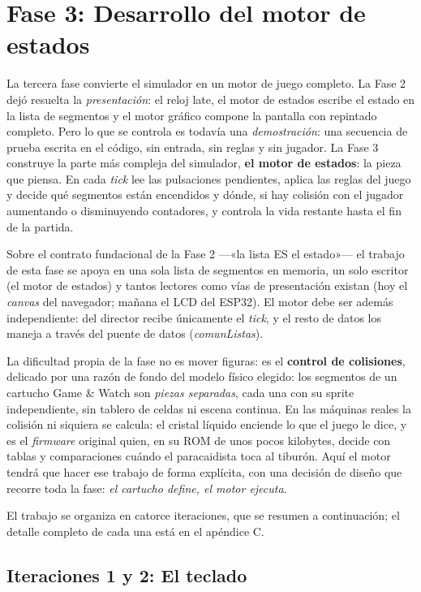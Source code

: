 \section{Fase 3: Desarrollo del motor de estados}
\label{sec:Fase3Resumen}

La tercera fase convierte el simulador en un motor de juego completo.
La Fase 2 dejó resuelta la \emph{presentación}: el reloj late, el motor
de estados escribe el estado en la lista de segmentos y el motor gráfico
compone la pantalla con repintado completo. Pero lo que se controla es
todavía una \emph{demostración}: una secuencia de prueba escrita en el
código, sin entrada, sin reglas y sin jugador. La Fase 3 construye la
parte más compleja del simulador, \textbf{el motor de estados}: la pieza
que piensa. En cada \textit{tick} lee las pulsaciones pendientes, aplica
las reglas del juego y decide qué segmentos están encendidos y dónde, si
hay colisión con el jugador aumentando o disminuyendo contadores, y
controla la vida restante hasta el fin de la partida.

Sobre el contrato fundacional de la Fase 2 —«la lista ES el estado»— el
trabajo de esta fase se apoya en una sola lista de segmentos en memoria,
un solo escritor (el motor de estados) y tantos lectores como vías de
presentación existan (hoy el \textit{canvas} del navegador; mañana el
LCD del ESP32). El motor debe ser además independiente: del director
recibe únicamente el \textit{tick}, y el resto de datos los maneja a
través del puente de datos (\emph{comunListas}).

La dificultad propia de la fase no es mover figuras: es el
\textbf{control de colisiones}, delicado por una razón de fondo del
modelo físico elegido: los segmentos de un cartucho Game \& Watch son
\emph{piezas separadas}, cada una con su sprite independiente, sin
tablero de celdas ni escena continua. En las máquinas reales la
colisión ni siquiera se calcula: el cristal líquido enciende lo que el
juego le dice, y es el \emph{firmware} original quien, en su ROM de unos
pocos kilobytes, decide con tablas y comparaciones cuándo el
paracaidista toca al tiburón. Aquí el motor tendrá que hacer ese trabajo
de forma explícita, con una decisión de diseño que recorre toda la fase:
\emph{el cartucho define, el motor ejecuta}.

El trabajo se organiza en catorce iteraciones, que se resumen a
continuación; el detalle completo de cada una está en el apéndice C.

\subsection{Iteraciones 1 y 2: El teclado}
\label{sec:F3Teclado}


